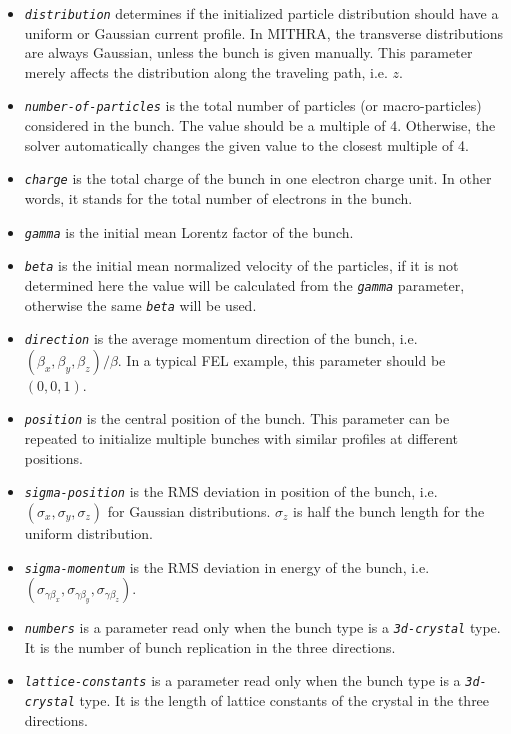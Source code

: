 \begin{enumerate}
\begin{itemize}
%
\item {\tt \small \em distribution} determines if the initialized particle distribution should have a uniform or Gaussian current profile. In MITHRA, the transverse distributions are always Gaussian, unless the bunch is given manually. This parameter merely affects the distribution along the traveling path, i.e. $z$.
%
\item {\tt \small \em number-of-particles} is the total number of particles (or macro-particles) considered in the bunch. The value should be a multiple of 4. Otherwise, the solver automatically changes the given value to the closest multiple of 4.
%
\item {\tt \small \em charge} is the total charge of the bunch in one electron charge unit. In other words, it stands for the total number of electrons in the bunch.
%
\item {\tt \small \em gamma} is the initial mean Lorentz factor of the bunch.
%
\item {\tt \small \em beta} is the initial mean normalized velocity of the particles, if it is not determined here the value will be calculated from the {\tt \small \em gamma} parameter, otherwise the same {\tt \small \em beta} will be used.
%
\item {\tt \small \em direction} is the average momentum direction of the bunch, i.e. $(\beta_x, \beta_y, \beta_z)/\beta$. In a typical FEL example, this parameter should be $(0, 0, 1)$.
%
\item {\tt \small \em position} is the central position of the bunch. This parameter can be repeated to initialize multiple bunches with similar profiles at different positions.
%
\item {\tt \small \em sigma-position} is the RMS deviation in position of the bunch, i.e. $(\sigma_x, \sigma_y, \sigma_z)$ for Gaussian distributions. $\sigma_z$ is half the bunch length for the uniform distribution.
%
\item {\tt \small \em sigma-momentum} is the RMS deviation in energy of the bunch, i.e. $(\sigma_{\gamma \beta_x}, \sigma_{\gamma \beta_y}, \sigma_{\gamma \beta_z})$.
%
\item {\tt \small \em numbers} is a parameter read only when the bunch type is a {\tt \small \em 3d-crystal} type. It is the number of bunch replication in the three directions.
%
\item {\tt \small \em lattice-constants} is a parameter read only when the bunch type is a {\tt \small \em 3d-crystal} type. It is the length of lattice constants of the crystal in the three directions.

\end{itemize}
\end{enumerate}

